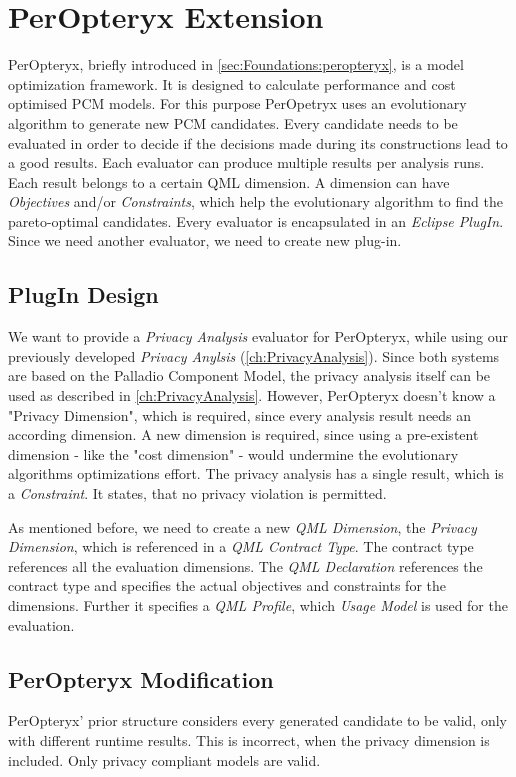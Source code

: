 \chapter{PerOpteryx Extension}
\label{ch:PerOpt}

PerOpteryx, briefly introduced in \autoref{sec:Foundations:peropteryx}, is a model optimization framework. It is designed to calculate performance and cost optimised PCM models. For this purpose PerOpetryx uses an evolutionary algorithm to generate new PCM candidates. Every candidate needs to be evaluated in order to decide if the decisions made during its constructions lead to a good results. Each evaluator can produce multiple results per analysis runs. Each result belongs to a certain QML dimension. A dimension can have \textit{Objectives} and/or \textit{Constraints}, which help the evolutionary algorithm to find the pareto-optimal candidates. Every evaluator is encapsulated in an \textit{Eclipse PlugIn}. Since we need another evaluator, we need to create new plug-in.

\section{PlugIn Design}
\label{sec:PerOpt:design}

We want to provide a \textit{Privacy Analysis} evaluator for PerOpteryx, while using our previously developed \textit{Privacy Anylsis} (\autoref{ch:PrivacyAnalysis}). Since both systems are based on the Palladio Component Model, the privacy analysis itself can be used as described in \autoref{ch:PrivacyAnalysis}. However, PerOpteryx doesn't know a "Privacy Dimension", which is required, since every analysis result needs an according dimension. A new dimension is required, since using a pre-existent dimension - like the "cost dimension" - would undermine the evolutionary algorithms optimizations effort. The privacy analysis has a single result, which is a \textit{Constraint}. It states, that no privacy violation is permitted.

As mentioned before, we need to create a new \textit{QML Dimension}, the \textit{Privacy Dimension}, which is referenced in a \textit{QML Contract Type}. The contract type references all the evaluation dimensions. The \textit{QML Declaration} references the contract type and specifies the actual objectives and constraints for the dimensions. Further it specifies a \textit{QML Profile}, which \textit{Usage Model} is used for the evaluation.


\section{PerOpteryx Modification}

PerOpteryx' prior structure considers every generated candidate to be valid, only with different runtime results. This is incorrect, when the privacy dimension is included. Only privacy compliant models are valid. 
 

